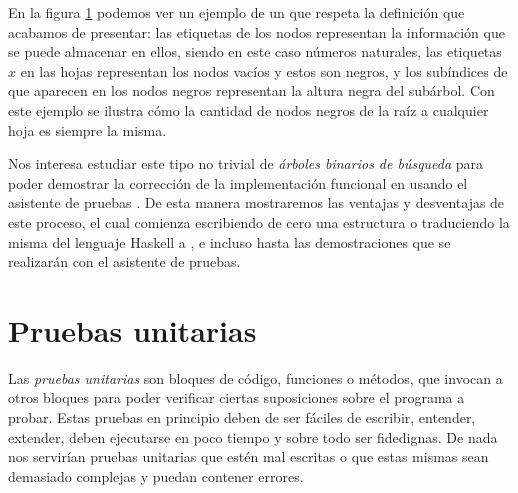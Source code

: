 \begin{figure}[!ht]
\centering
\captionsetup{justification=centering}
\caption {\Arn}
\label{arbolRB_1}
\end{figure}

En la figura \ref{arbolRB_1} podemos ver un ejemplo de un {\arn} que respeta la definici\'on que
acabamos de presentar: las etiquetas de los nodos representan la informaci\'on que se puede 
almacenar en ellos, siendo en este caso n\'umeros naturales, las etiquetas $x$ en las hojas 
representan los nodos vacíos y estos son negros, y los subíndices de que aparecen en los nodos 
negros representan la altura negra del sub\'arbol. Con este ejemplo se ilustra c\'omo la cantidad de 
nodos negros de la ra\'iz a cualquier hoja es siempre la misma.

Nos interesa estudiar este tipo no trivial de \textit{\'arboles binarios de búsqueda} para poder
demostrar la correcci\'on de la implementaci\'on funcional en \cite{tesisG} usando el asistente de 
pruebas {\coq}. De esta manera mostraremos las ventajas y desventajas de este proceso, el cual 
comienza escribiendo de cero una estructura o traduciendo la misma del lenguaje Haskell a {\coq}, e 
incluso hasta las demostraciones que se realizar\'an con el asistente de pruebas.

\section{Pruebas unitarias}
Las \textit{pruebas unitarias} \cite{unittest} son bloques de c\'odigo, funciones o m\'etodos, que
invocan a otros bloques para poder verificar ciertas suposiciones sobre el programa a probar. Estas
pruebas en principio deben de ser fáciles de escribir, entender, extender, deben ejecutarse en poco
tiempo y sobre todo ser fidedignas. De nada nos servirían pruebas unitarias que estén mal
escritas o que estas mismas sean demasiado complejas y puedan contener errores.

